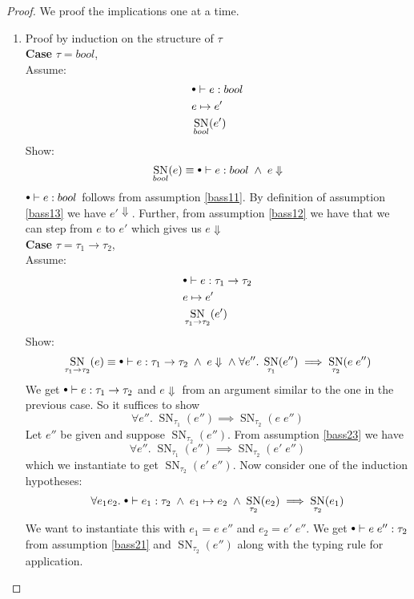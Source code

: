 \documentclass[a4paper,10pt,fleqn]{article}
\DeclareMathOperator{\SNPred}{SN}
\newcommand{\evalto}{\ensuremath{\mapsto}}
\newcommand{\mtenv}{{\raisebox{1.5pt}{$\scriptstyle\bullet$}}}
\newcommand{\case}[1]{~\\{\bf Case} #1,~\\}
\newcommand{\tarrow}[2]{\ensuremath{ #1 \rightarrow #2}}
\newcommand{\SN}[2]{\ensuremath{\SNPred_{#1}(#2)}}
\newcommand{\pand}{\ensuremath{\; \wedge \;}}
\begin{document}
\begin{proof}
  We proof the implications one at a time.
  \begin{enumerate}
  \item Proof by induction on the structure of $\tau$ 
    \case{$\tau=bool$}
    Assume:
    \begin{align}
      &\mtenv \vdash e : bool \label{bass11}\\
      &e\evalto e' \label{bass12} \\
      &\SN{bool}{e'} \label{bass13}
    \end{align}
    Show:
    \[
    \SN{bool}{e} \equiv \mtenv \vdash e : bool \pand e \Downarrow
    \]
    $\mtenv \vdash e : bool$ follows from assumption \ref{bass11}. By definition of assumption \ref{bass13} we have $e' \Downarrow$. Further, from assumption \ref{bass12} we have that we can step from $e$ to $e'$ which gives us $e \Downarrow$
%
%
    \case{$\tau=\tarrow{\tau_1}{\tau_2}$} Assume:
    \begin{align}
      &\mtenv \vdash e : \tarrow{\tau_1}{\tau_2} \label{bass21}\\
      &e\evalto e' \label{bass22} \\
      &\SN{\tarrow{\tau_1}{\tau_2}}{e'} \label{bass23}
    \end{align}
    Show:
    \[
      \SN{\tarrow{\tau_1}{\tau_2}}{e} \equiv \mtenv \vdash e : \tarrow{\tau_1}{\tau_2} \pand e \Downarrow \pand \forall e''. \; \SN{\tau_1}{e''} \implies \SN{\tau_2}{e \; e''}
    \]
    We get $\mtenv \vdash e : \tarrow{\tau_1}{\tau_2}$ and $e \Downarrow$ from an argument similar to the one in the previous case. So it suffices to show
    \[
      \forall e''. \; \SN{\tau_1}{e''} \implies \SN{\tau_2}{e \; e''}
    \]
    Let $e''$ be given and suppose $\SN{\tau_2}{e''}$. From assumption \ref{bass23} we have 
    \[
      \forall e''. \; \SN{\tau_1}{e''} \implies \SN{\tau_2}{e' \; e''}
    \]
    which we instantiate to get $\SN{\tau_2}{e' \; e''}$. 
    Now consider one of the induction hypotheses:
    \[
    \forall e_1 e_2.\; \mtenv \vdash e_1 : \tau_2 \pand e_1 \evalto e_2 \pand \SN{\tau_2}{e_2} \implies \SN{\tau_2}{e_1}
    \]
    We want to instantiate this with $e_1 = e \; e''$ and $e_2 = e' \; e''$. We get $\mtenv \vdash e \; e'' : \tau_2$ from assumption \ref{bass21} and $\SN{\tau_2}{e''}$ along with the typing rule for application.
    \begin{comment}
      \[
      \inferrule*{\inferrule*{ (\ref{bass21}) }
        {\mtenv \vdash e : \tarrow{\tau_1}{\tau_2}}
        \and
        \inferrule*{ \SN{\tau_2}{e''} }

\end{comment}
\end{enumerate}
\end{proof}
\end{document}
